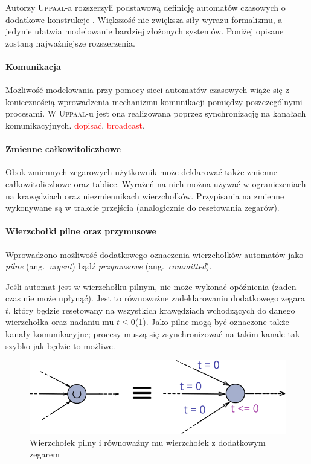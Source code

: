 \documentclass{pracamgr}
\newcommand{\ang}[1]{(ang.~\emph{#1})}
\newcommand{\todo}[1]{\textcolor{red}{#1}}
\newcommand{\upp}{\textsc{Uppaal}}
\theoremstyle{plain}
\begin{document}
Autorzy \upp-a rozszerzyli podstawową definicję automatów czasowych o
dodatkowe konstrukcje \cite{by-lncs04}. Większość nie zwiększa siły
wyrazu formalizmu, a jedynie ułatwia modelowanie bardziej złożonych
systemów.  Poniżej opisane zostaną najważniejsze rozszerzenia.

\paragraph{Komunikacja} Możliwość modelowania przy pomocy sieci
automatów czasowych wiąże się z koniecznością wprowadzenia mechanizmu
komunikacji pomiędzy poszczególnymi procesami. W \upp-u jest ona
realizowana poprzez synchronizację na kanałach komunikacyjnych.
\todo{dopisać}.
\todo{broadcast}.

\paragraph{Zmienne całkowitoliczbowe} Obok zmiennych zegarowych
użytkownik może deklarować także zmienne całkowitoliczbowe oraz
tablice. Wyrażeń na nich można używać w ograniczeniach na krawędziach
oraz niezmiennikach wierzchołków. Przypisania na zmienne wykonywane są
w trakcie przejścia (analogicznie do resetowania zegarów).

\paragraph{Wierzchołki pilne oraz przymusowe} Wprowadzono możliwość
dodatkowego oznaczenia wierzchołków automatów jako \emph{pilne}
\ang{urgent} bądź \emph{przymusowe} \ang{committed}.

Jeśli automat jest w wierzchołku pilnym, nie może wykonać opóźnienia
(żaden czas nie może upłynąć). Jest to równoważne zadeklarowaniu
dodatkowego zegara $t$, który będzie resetowany na wszystkich
krawędziach wchodzących do danego wierzchołka oraz nadaniu mu $t \leq
0$(\ref{img:uppaal-urgent}). Jako pilne mogą być oznaczone także
kanały komunikacyjne; procesy muszą się zsynchronizować na takim
kanale tak szybko jak będzie to możliwe.

\begin{figure}[ht]
  \centering
  \includegraphics[width=.8\textwidth]{img/uppaal-urgent}
  \caption{Wierzchołek pilny i równoważny mu wierzchołek z dodatkowym
    zegarem}
  \label{img:uppaal-urgent}
\end{figure}
\end{document}

